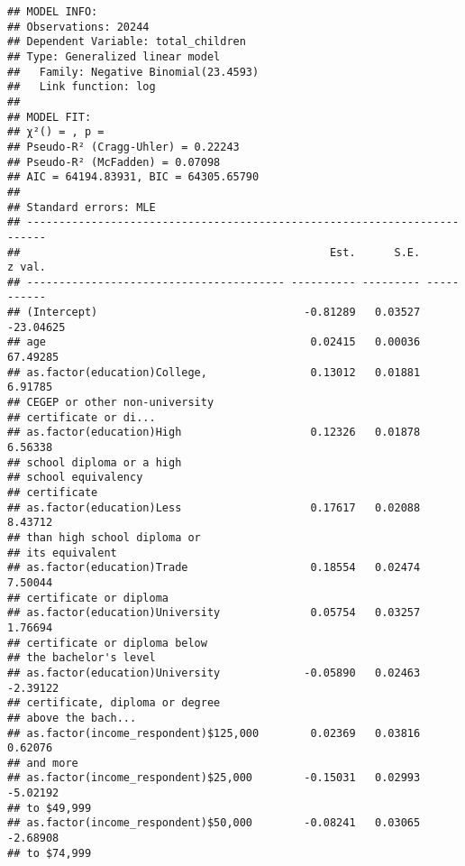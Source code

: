 \documentclass[
]{article}
\begin{document}
\begin{verbatim}
## MODEL INFO:
## Observations: 20244
## Dependent Variable: total_children
## Type: Generalized linear model
##   Family: Negative Binomial(23.4593) 
##   Link function: log 
## 
## MODEL FIT:
## χ²() = , p = 
## Pseudo-R² (Cragg-Uhler) = 0.22243
## Pseudo-R² (McFadden) = 0.07098
## AIC = 64194.83931, BIC = 64305.65790 
## 
## Standard errors: MLE
## -------------------------------------------------------------------------
##                                                Est.      S.E.      z val.
## ---------------------------------------- ---------- --------- -----------
## (Intercept)                                -0.81289   0.03527   -23.04625
## age                                         0.02415   0.00036    67.49285
## as.factor(education)College,                0.13012   0.01881     6.91785
## CEGEP or other non-university                                            
## certificate or di...                                                     
## as.factor(education)High                    0.12326   0.01878     6.56338
## school diploma or a high                                                 
## school equivalency                                                       
## certificate                                                              
## as.factor(education)Less                    0.17617   0.02088     8.43712
## than high school diploma or                                              
## its equivalent                                                           
## as.factor(education)Trade                   0.18554   0.02474     7.50044
## certificate or diploma                                                   
## as.factor(education)University              0.05754   0.03257     1.76694
## certificate or diploma below                                             
## the bachelor's level                                                     
## as.factor(education)University             -0.05890   0.02463    -2.39122
## certificate, diploma or degree                                           
## above the bach...                                                        
## as.factor(income_respondent)$125,000        0.02369   0.03816     0.62076
## and more                                                                 
## as.factor(income_respondent)$25,000        -0.15031   0.02993    -5.02192
## to $49,999                                                               
## as.factor(income_respondent)$50,000        -0.08241   0.03065    -2.68908
## to $74,999                                                               

\end{verbatim}
\end{document}
